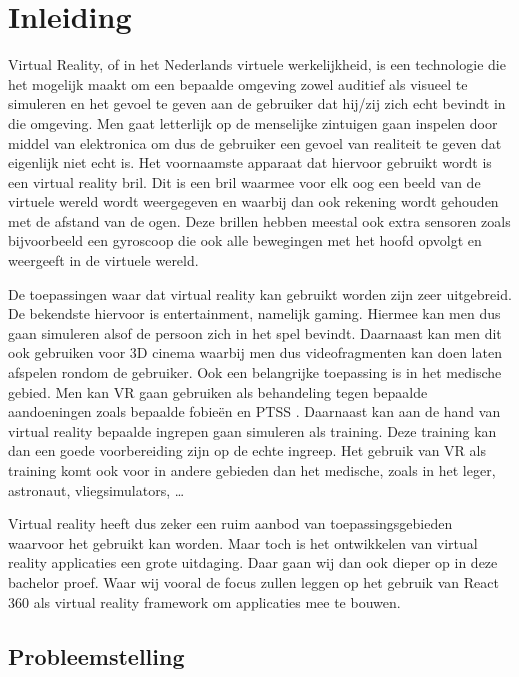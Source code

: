 
\chapter{Inleiding}
\label{ch:inleiding}
Virtual Reality, of in het Nederlands virtuele werkelijkheid, is een technologie die het mogelijk maakt om een bepaalde omgeving zowel auditief als visueel te simuleren en het gevoel te geven aan de gebruiker dat hij/zij zich echt bevindt in die omgeving. Men gaat letterlijk op de menselijke zintuigen gaan inspelen door middel van elektronica om dus de gebruiker een gevoel van realiteit te geven dat eigenlijk niet echt is. Het voornaamste apparaat dat hiervoor gebruikt wordt is een virtual reality bril. Dit is een bril waarmee voor elk oog een beeld van de virtuele wereld wordt weergegeven en waarbij dan ook rekening wordt gehouden met de afstand van de ogen. Deze brillen hebben meestal ook extra sensoren zoals bijvoorbeeld een gyroscoop die ook alle bewegingen met het hoofd opvolgt en weergeeft in de virtuele wereld.

De toepassingen waar dat virtual reality kan gebruikt worden zijn zeer uitgebreid. De bekendste hiervoor is entertainment, namelijk gaming. Hiermee kan men dus gaan simuleren alsof de persoon zich in het spel bevindt. Daarnaast kan men dit ook gebruiken voor 3D cinema waarbij men dus videofragmenten kan doen laten afspelen rondom de gebruiker. Ook een belangrijke toepassing is in het medische gebied. Men kan VR gaan gebruiken als behandeling tegen bepaalde aandoeningen zoals bepaalde fobieën en PTSS \autocite{WikipediaVR2018}. Daarnaast kan aan de hand van virtual reality bepaalde ingrepen gaan simuleren als training. Deze training kan dan een goede voorbereiding zijn op de echte ingreep. Het gebruik van VR als training komt ook voor in andere gebieden dan het medische, zoals in het leger, astronaut, vliegsimulators, …

Virtual reality heeft dus zeker een ruim aanbod van toepassingsgebieden waarvoor het gebruikt kan worden. Maar toch is het ontwikkelen van virtual reality applicaties een grote uitdaging. Daar gaan wij dan ook dieper op in deze bachelor proef. Waar wij vooral de focus zullen leggen op het gebruik van React 360 als virtual reality framework om applicaties mee te bouwen.

\section{Probleemstelling}
\label{sec:probleemstelling}

